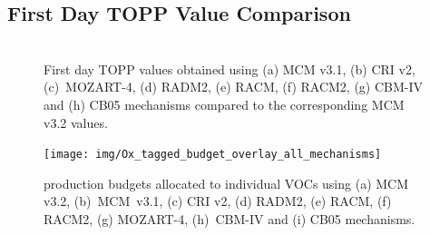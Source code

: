 
\subsection{First Day TOPP Value Comparison} \label{ss:day1} %

\begin{figure}
    \centering
    \includegraphics[width=\textwidth]{img/first_day_values}
    \vspace{0mm}
    \caption{First day TOPP values obtained using (a) MCM v3.1, (b) CRI v2, \mbox{(c) MOZART-4}, (d) RADM2, (e) RACM, (f) RACM2, (g) CBM-IV and (h) CB05 mechanisms compared to the corresponding MCM v3.2 values.}
    \vspace{-4mm}
    \label{f:first_day}
\end{figure}

\begin{figure}
    \centering
    \texttt{[image: img/Ox\_tagged\_budget\_overlay\_all\_mechanisms]}
    \vspace{0mm}
    \caption{ production budgets allocated to individual VOCs using (a) MCM v3.2, \mbox{(b) MCM v3.1}, (c) CRI v2, (d) RADM2, (e) RACM, (f) RACM2, (g) MOZART-4, \mbox{(h) CBM-IV} and (i) CB05 mechanisms.}
    \vspace{-4mm}
    \label{f:Ox_tagged_budgets}
\end{figure}


